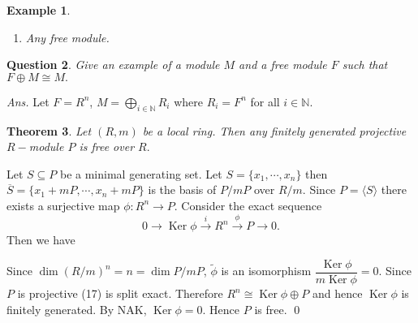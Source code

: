 \documentclass[11pt]{amsart}
\newtheorem{theorem}{Theorem}[section]
\newtheorem{qns}[theorem]{Question}
\newtheorem{eg}[theorem]{Example}
\newcommand{\NN}{\mathbb N}
\newcommand\isom{\mathrel{\stackon[-0.1ex]{\makebox*{\scalebox{1.08}{\AC}}{=\hfill\llap{=}}}{{\AC}}}}
\newcommand\nvisom{\rotatebox[origin=cc] {-90}{$ \isom $}}
\newcommand{\gen}[1]{\langle#1\rangle}
\DeclareMathOperator{\Ker}{\text{Ker}}
\begin{document}
\begin{eg}

\begin{enumerate}

\item Any free module.

\end{enumerate}

\end{eg}

\begin{qns}

Give an example of a module $M$ and a free module $F$ such that $F\oplus M\cong M.$

\end{qns}

\textit{Ans.} Let $F=R^n$, $M=\displaystyle\bigoplus_{i\in{\NN}} R_i$ where $R_i=F^n$ for all $i\in{\NN}.$

\begin{theorem}

Let $(R,m)$ be a local ring. Then any finitely generated projective $R-$module $P$ is free over $R.$

\end{theorem}

\proof Let $S\subseteq P$ be a minimal generating set. Let $S=\{x_1,\cdots,x_n\}$ then $\overline{S}=\{x_1+mP,\cdots,x_n+mP\}$ is the basis of $P/mP$ over $R/m.$ Since $P=\gen{S}$ there exists a surjective map $\phi:R^n\to P$. Consider the exact sequence \begin{equation}
0\to \Ker \phi\xrightarrow{i} R^n\xrightarrow{\phi}P\to 0.
\end{equation} Then we have 

\begin{center}


\end{center}

Since $\dim (R/m)^n=n=\dim P/mP$, $\tilde{\phi}$ is an isomorphism $\dfrac{\Ker \phi}{m\Ker \phi}=0.$ Since $P$ is projective (17) is split exact. Therefore $R^n\cong \Ker \phi\oplus P$ and hence $\Ker \phi$ is finitely generated. By NAK, $\Ker\phi=0$. Hence $P$ is free. \qed
\end{document}
